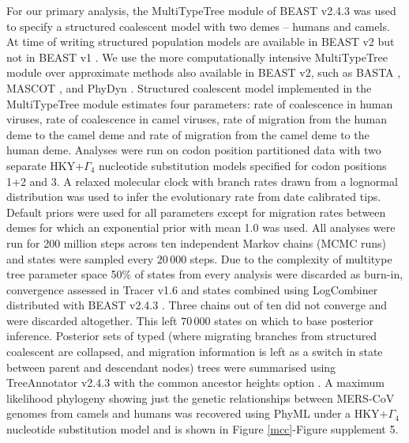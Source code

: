\documentclass[9pt,lineno]{elife}
\begin{document}
For our primary analysis, the MultiTypeTree module \citep{vaughan_efficient_2014} of BEAST v2.4.3 \citep{bouckaert_beast_2014} was used to specify a structured coalescent model with two demes -- humans and camels.
At time of writing structured population models are available in BEAST v2 \citep{bouckaert_beast_2014} but not in BEAST v1 \citep{drummond_bayesian_2012}.
We use the more computationally intensive MultiTypeTree module \citep{vaughan_efficient_2014} over approximate methods also available in BEAST v2, such as BASTA \citep{maio_new_2015}, MASCOT \citep{mueller_mascot:_2017}, and PhyDyn \citep{volz_complex_2011}.
Structured coalescent model implemented in the MultiTypeTree module \citep{vaughan_efficient_2014} estimates four parameters: rate of coalescence in human viruses, rate of coalescence in camel viruses, rate of migration from the human deme to the camel deme and rate of migration from the camel deme to the human deme.
Analyses were run on codon position partitioned data with two separate HKY+$\Gamma_{4}$ \citep{hky_1985,yang_1994} nucleotide substitution models specified for codon positions 1+2 and 3.
A relaxed molecular clock with branch rates drawn from a lognormal distribution \citep{drummond_2006} was used to infer the evolutionary rate from date calibrated tips.
Default priors were used for all parameters except for migration rates between demes for which an exponential prior with mean 1.0 was used.
All analyses were run for 200 million steps across ten independent Markov chains (MCMC runs) and states were sampled every $20\,000$ steps.
Due to the complexity of multitype tree parameter space 50\% of states from every analysis were discarded as burn-in, convergence assessed in Tracer v1.6 and states combined using LogCombiner distributed with BEAST v2.4.3 \citep{bouckaert_beast_2014}.
Three chains out of ten did not converge and were discarded altogether.
This left $70\,000$ states on which to base posterior inference.
Posterior sets of typed (where migrating branches from structured coalescent are collapsed, and migration information is left as a switch in state between parent and descendant nodes) trees were summarised using TreeAnnotator v2.4.3 with the common ancestor heights option \citep{heled_looking_2013}.
A maximum likelihood phylogeny showing just the genetic relationships between MERS-CoV genomes from camels and humans was recovered using PhyML \citep{guindon_simple_2003} under a HKY+$\Gamma_{4}$ \citep{hky_1985,yang_1994} nucleotide substitution model and is shown in Figure \ref{mcc}-Figure supplement 5.
\end{document}
